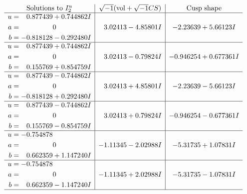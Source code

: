 \documentclass[1p]{elsarticle_modified}
\theoremstyle{definition}
\newcommand{\I}{\sqrt{-1}}
\begin{document}
$$\begin{array}{c|c|c}  
\text{Solutions to }I^u_{2}& \I (\text{vol} + \sqrt{-1}CS) & \text{Cusp shape}\\
 \hline 
\begin{aligned}
u &= \phantom{-}0.877439 + 0.744862 I \\
a &= \phantom{-0.000000 } 0 \\
b &= -0.818128 - 0.292480 I\end{aligned}
 & \phantom{-}3.02413 - 4.85801 I & -2.23639 + 5.66123 I \\ \hline\begin{aligned}
u &= \phantom{-}0.877439 + 0.744862 I \\
a &= \phantom{-0.000000 } 0 \\
b &= \phantom{-}0.155769 + 0.854759 I\end{aligned}
 & \phantom{-}3.02413 - 0.79824 I & -0.946254 + 0.677361 I \\ \hline\begin{aligned}
u &= \phantom{-}0.877439 - 0.744862 I \\
a &= \phantom{-0.000000 } 0 \\
b &= -0.818128 + 0.292480 I\end{aligned}
 & \phantom{-}3.02413 + 4.85801 I & -2.23639 - 5.66123 I \\ \hline\begin{aligned}
u &= \phantom{-}0.877439 - 0.744862 I \\
a &= \phantom{-0.000000 } 0 \\
b &= \phantom{-}0.155769 - 0.854759 I\end{aligned}
 & \phantom{-}3.02413 + 0.79824 I & -0.946254 - 0.677361 I \\ \hline\begin{aligned}
u &= -0.754878\phantom{ +0.000000I} \\
a &= \phantom{-0.000000 } 0 \\
b &= \phantom{-}0.662359 + 1.147240 I\end{aligned}
 & -1.11345 - 2.02988 I & -5.31735 + 1.07831 I \\ \hline\begin{aligned}
u &= -0.754878\phantom{ +0.000000I} \\
a &= \phantom{-0.000000 } 0 \\
b &= \phantom{-}0.662359 - 1.147240 I\end{aligned}
 & -1.11345 + 2.02988 I & -5.31735 - 1.07831 I\\
 \hline 
 \end{array}$$\newpage
\end{document}
